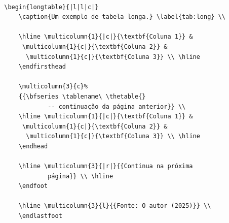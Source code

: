 \begin{enumerate}
	\begin{verbatim}

		\begin{longtable}{|l|l|c|}
			\caption{Um exemplo de tabela longa.} \label{tab:long} \\
			
			\hline \multicolumn{1}{|c|}{\textbf{Coluna 1}} &
			 \multicolumn{1}{c|}{\textbf{Coluna 2}} &
			  \multicolumn{1}{c|}{\textbf{Coluna 3}} \\ \hline 
			\endfirsthead
			
			\multicolumn{3}{c}%
			{{\bfseries \tablename\ \thetable{} 
					-- continuação da página anterior}} \\
			\hline \multicolumn{1}{|c|}{\textbf{Coluna 1}} &
			 \multicolumn{1}{c|}{\textbf{Coluna 2}} &
			  \multicolumn{1}{c|}{\textbf{Coluna 3}} \\ \hline 
			\endhead
			
			\hline \multicolumn{3}{|r|}{{Continua na próxima 
					página}} \\ \hline
			\endfoot
			
			\hline \multicolumn{3}{l}{{Fonte: O autor (2025)}} \\
			\endlastfoot
			

\end{verbatim}
\end{enumerate}
